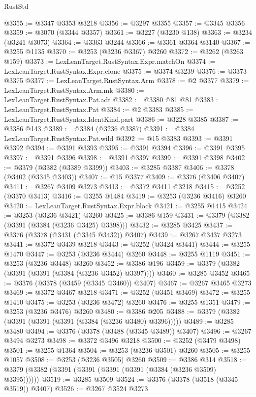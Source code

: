 \begin{lexlean}{RustStd}
\begin{coremodule}
@3355 := @3347 @3353 @3218
@3356 := @3297 @3355
@3357 := @3345 @3356
@3359 := @3070 (@3344 @3357)
@3361 := @3227 (@3230 @138)
@3363 := @3234 (@3241 @3073)
@3364 := @3363 @3244
@3366 := @3361 @3364 @3140
@3367 := @3255 @1135
@3370 := @3253 (@3236 @3367) @3260
@3372 := @3262 (@3263 @159)
@3373 := LexLeanTarget.RustSyntax.Expr.matchOn
@3374 := LexLeanTarget.RustSyntax.Expr.clone
@3375 := @3374 @3239
@3376 := @3373 @3375
@3377 := LexLeanTarget.RustSyntax.Arm
@3378 := @2 @3377
@3379 := LexLeanTarget.RustSyntax.Arm.mk
@3380 := LexLeanTarget.RustSyntax.Pat.adt
@3382 := @3380 @81 @81
@3383 := LexLeanTarget.RustSyntax.Pat
@3384 := @2 @3383
@3385 := LexLeanTarget.RustSyntax.IdentKind.part
@3386 := @3228 @3385
@3387 := @3386 @143
@3389 := @3384 (@3236 @3387)
@3391 := @3384 LexLeanTarget.RustSyntax.Pat.wild
@3392 := @15 @3383
@3393 := @3391 @3392
@3394 := @3391 @3393
@3395 := @3391 @3394
@3396 := @3391 @3395
@3397 := @3391 @3396
@3398 := @3391 @3397
@3399 := @3391 @3398
@3402 := @3379 (@3382 (@3389 @3399))
@3403 := @3285 @3387
@3406 := @3378 (@3402 (@3345 @3403))
@3407 := @15 @3377
@3409 := @3376 (@3406 @3407)
@3411 := @3267 @3409 @3273
@3413 := @3372 @3411 @3218
@3415 := @3252 (@3370 @3413)
@3416 := @3255 @1484
@3419 := @3253 (@3236 @3416) @3260
@3420 := LexLeanTarget.RustSyntax.Expr.block
@3421 := @3255 @1415
@3424 := @3253 (@3236 @3421) @3260
@3425 := @3386 @159
@3431 := @3379 (@3382 (@3391 (@3384 (@3236 @3425) @3398)))
@3432 := @3285 @3425
@3437 := @3376 (@3378 (@3431 (@3345 @3432)) @3407)
@3439 := @3267 @3437 @3273
@3441 := @3372 @3439 @3218
@3443 := @3252 (@3424 @3441)
@3444 := @3255 @1470
@3447 := @3253 (@3236 @3444) @3260
@3448 := @3255 @1119
@3451 := @3253 (@3236 @3448) @3260
@3452 := @3386 @196
@3459 := @3379 (@3382 (@3391 (@3391 (@3384 (@3236 @3452) @3397))))
@3460 := @3285 @3452
@3465 := @3376 (@3378 (@3459 (@3345 @3460)) @3407)
@3467 := @3267 @3465 @3273
@3469 := @3372 @3467 @3218
@3471 := @3252 (@3451 @3469)
@3472 := @3255 @1410
@3475 := @3253 (@3236 @3472) @3260
@3476 := @3255 @1351
@3479 := @3253 (@3236 @3476) @3260
@3480 := @3386 @205
@3488 := @3379 (@3382 (@3391 (@3391 (@3391 (@3384 (@3236 @3480) @3396)))))
@3489 := @3285 @3480
@3494 := @3376 (@3378 (@3488 (@3345 @3489)) @3407)
@3496 := @3267 @3494 @3273
@3498 := @3372 @3496 @3218
@3500 := @3252 (@3479 @3498)
@3501 := @3255 @1364
@3504 := @3253 (@3236 @3501) @3260
@3505 := @3255 @1057
@3508 := @3253 (@3236 @3505) @3260
@3509 := @3386 @314
@3518 := @3379 (@3382 (@3391 (@3391 (@3391 (@3391 (@3384 (@3236 @3509) @3395))))))
@3519 := @3285 @3509
@3524 := @3376 (@3378 (@3518 (@3345 @3519)) @3407)
@3526 := @3267 @3524 @3273

\end{coremodule}
\end{lexlean}
